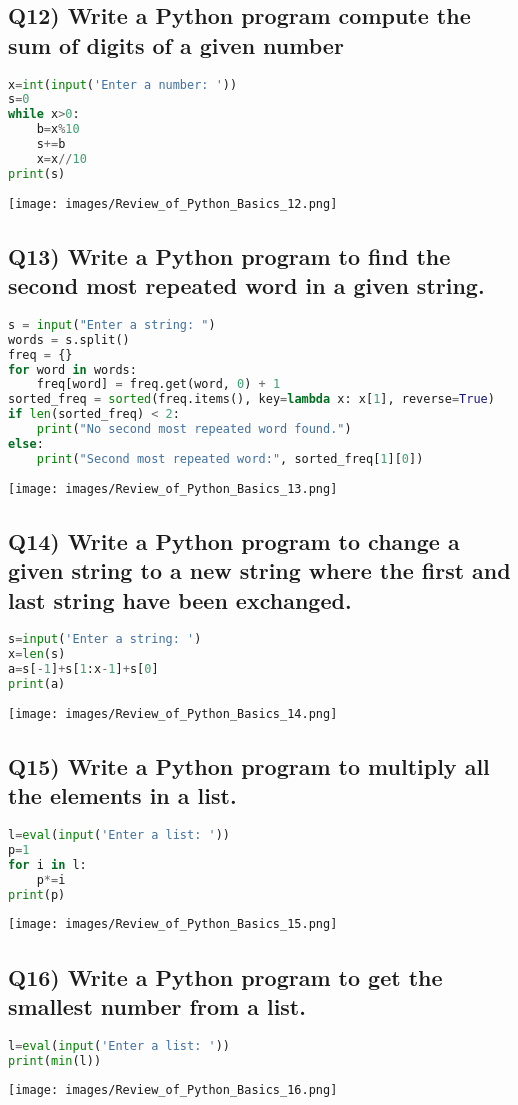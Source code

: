 \documentclass{article}
\begin{document}
\subsection*{Q12) Write a Python program compute the sum of digits of a given number}
\begin{lstlisting}[language=Python]
x=int(input('Enter a number: '))
s=0
while x>0:
    b=x%10
    s+=b
    x=x//10
print(s)
\end{lstlisting}
\texttt{[image: images/Review\_of\_Python\_Basics\_12.png]}

\subsection*{Q13) Write a Python program to find the second most repeated word in a given string.}
\begin{lstlisting}[language=Python]
s = input("Enter a string: ")
words = s.split()
freq = {}
for word in words:
    freq[word] = freq.get(word, 0) + 1
sorted_freq = sorted(freq.items(), key=lambda x: x[1], reverse=True)
if len(sorted_freq) < 2:
    print("No second most repeated word found.")
else:
    print("Second most repeated word:", sorted_freq[1][0])
\end{lstlisting}
\texttt{[image: images/Review\_of\_Python\_Basics\_13.png]}

\subsection*{Q14) Write a Python program to change a given string to a new string where the first and last string have been exchanged.}
\begin{lstlisting}[language=Python]
s=input('Enter a string: ')
x=len(s)
a=s[-1]+s[1:x-1]+s[0]
print(a)
\end{lstlisting}
\texttt{[image: images/Review\_of\_Python\_Basics\_14.png]}

\subsection*{Q15) Write a Python program to multiply all the elements in a list.}
\begin{lstlisting}[language=Python]
l=eval(input('Enter a list: '))
p=1
for i in l:
    p*=i
print(p)
\end{lstlisting}
\texttt{[image: images/Review\_of\_Python\_Basics\_15.png]}

\subsection*{Q16) Write a Python program to get the smallest number from a list.}
\begin{lstlisting}[language=Python]
l=eval(input('Enter a list: '))
print(min(l))
\end{lstlisting}
\texttt{[image: images/Review\_of\_Python\_Basics\_16.png]}
\end{document}
